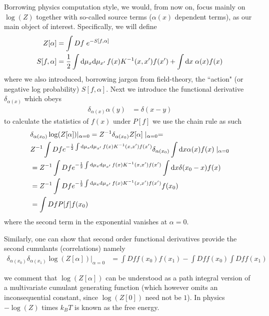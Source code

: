 Borrowing physics computation style, we would, from now on, focus mainly on $\log(Z)$ together with so-called source terms ($\alpha(x)$ dependent terms), as our main object of interest. Specifically, we will define 
\begin{align}
Z[\alpha] &= \int Df \; e^{-S[f,\alpha]}\\ \nonumber 
S[f,\alpha] &= \frac{1}{2} \int \text{d}\mu_x \text{d}\mu_{x'}\, f(x) K^{-1}(x,x') f(x')+\int \text{d} x \; \alpha(x) f(x)
\end{align}
where we also introduced, borrowing jargon from field-theory, the ``action" (or negative log probability) $S[f,\alpha]$. Next we introduce the functional derivative $\delta_{\alpha(x)}$ which obeys 
\begin{align}
\delta_{\alpha(x)} \alpha(y) &= \delta(x-y)
\end{align}
to calculate the statistics of $f(x)$ under $P[f]$ we use the chain rule as such 
\begin{align}
&\delta_{\alpha(x_0)} \log(Z[\alpha])|_{\alpha=0} = Z^{-1} \delta_{\alpha(x_0)} Z[\alpha]\mid_{\alpha=0} = \\ \nonumber  &Z^{-1} \int Df  e^{-\frac{1}{2} \int \text{d}\mu_x \text{d}\mu_{x'} \,f(x) K^{-1}(x,x') f(x')} \delta_{\alpha(x_0)}\int \text{d} x \alpha(x) f(x) \mid_{\alpha=0} \\ \nonumber 
&= Z^{-1} \int Df  e^{-\frac{1}{2} \int \text{d}\mu_x \text{d}\mu_{x'} \, f(x) K^{-1}(x,x') f(x')}\int \text{d} x \delta(x_0-x) f(x) \\ \nonumber 
&= Z^{-1} \int Df  e^{-\frac{1}{2} \int \text{d}\mu_x \text{d}\mu_{x'} \, f(x) K^{-1}(x,x') f(x')}f(x_0) \\ \nonumber
&= \int Df P[f] f(x_0)
\end{align}
where the second term in the exponential vanishes at $\alpha=0$.

Similarly, one can show that second order functional derivatives provide the second cumulants (correlations) namely  
\begin{align}
\delta_{\alpha(x_0)}\delta_{\alpha(x_1)} \log(Z[\alpha])|_{\alpha=0} &= \int Df f(x_0) f(x_1) -  \int Df f(x_0) \int Df f(x_1)
\end{align}

\noindent we comment that $\log(Z[\alpha])$ can be understood as a path integral version of a multivariate cumulant generating function (which however omits an inconsequential constant, since $\log(Z[0])$ need not be $1$). In physics $-\log(Z)$ times $k_B T$ is known as the free energy. 

